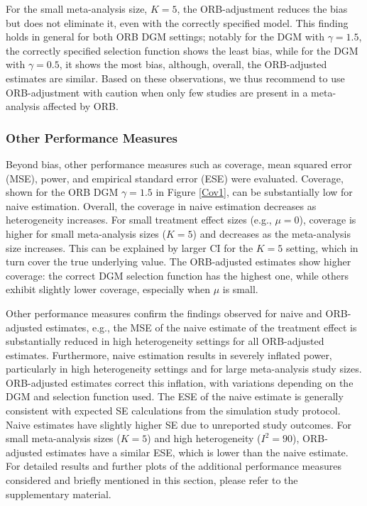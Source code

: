 \documentclass[twocolumn]{article}\usepackage[]{graphicx}\usepackage[]{xcolor}
\begin{document}
For the small meta-analysis size, $K=5$, the ORB-adjustment reduces the bias but does not eliminate it, even with the correctly specified model. This finding holds in general for both ORB DGM settings; notably for the DGM with $\gamma=1.5$, the correctly specified selection function shows the least bias, while for the DGM with $\gamma=0.5$, it shows the most bias, although, overall, the ORB-adjusted estimates are similar. Based on these observations, we thus recommend to use ORB-adjustment with caution when only few studies are present in a meta-analysis affected by ORB.

\subsubsection{Other Performance Measures}

Beyond bias, other performance measures such as coverage, mean squared error (MSE), power, and empirical standard error (ESE) were evaluated. Coverage, shown for the ORB DGM $\gamma=1.5$ in Figure \ref{Cov1}, can be substantially low for naive estimation. Overall, the coverage in naive estimation decreases as heterogeneity increases. For small treatment effect sizes (e.g., $\mu=0$), coverage is higher for small meta-analysis sizes ($K=5$) and decreases as the meta-analysis size increases. This can be explained by larger CI for the $K=5$ setting, which in turn cover the true underlying value. The ORB-adjusted estimates show higher coverage: the correct DGM selection function has the highest one, while others exhibit slightly lower coverage, especially when $\mu$ is small. 

Other performance measures confirm the findings observed for naive and ORB-adjusted estimates, e.g., the MSE of the naive estimate of the treatment effect is substantially reduced in high heterogeneity settings for all ORB-adjusted estimates. Furthermore, naive estimation results in severely inflated power, particularly in high heterogeneity settings and for large meta-analysis study sizes. ORB-adjusted estimates correct this inflation, with variations depending on the DGM and selection function used. The ESE of the naive estimate is generally consistent with expected SE calculations from the simulation study protocol. Naive estimates have slightly higher SE due to unreported study outcomes. For small meta-analysis sizes ($K=5$) and high heterogeneity ($I^2=90$), ORB-adjusted estimates have a similar ESE, which is lower than the naive estimate. For detailed results and further plots of the additional performance measures considered and briefly mentioned in this section, please refer to the supplementary material.
\end{document}
